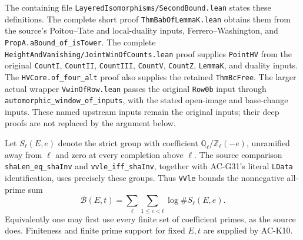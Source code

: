 The containing file \texttt{LayeredIsomorphisms/SecondBound.lean}
states these definitions.  The complete short proof
\texttt{ThmBabOfLemmaK.lean} obtains them from the source's
Poitou--Tate and local-duality inputs, Ferrero--Washington, and
\texttt{PropA.aBound\_of\_isTower}.  The complete
\texttt{HeightAndVanishing/JointWinOfCounts.lean} proof supplies
\texttt{PointHV} from the original \texttt{CountI},
\texttt{CountII}, \texttt{CountIII}, \texttt{CountV},
\texttt{CountZ}, \texttt{LemmaK}, and duality inputs.
The \texttt{HVCore.of\_four\_alt} proof also supplies the
retained \texttt{ThmBcFree}.  The larger actual wrapper
\texttt{VwinOfRow.lean} passes the original \texttt{Row0b}
input through \texttt{automorphic\_window\_of\_inputs}, with
the stated open-image and base-change inputs.
These named upstream inputs remain the original inputs; their
deep proofs are not replaced by the argument below.

Let $S_\ell(E,e)$ denote the strict group with coefficient
$\mathbb Q_\ell/\mathbb Z_\ell(-e)$, unramified away from
$\ell$ and zero at every completion above $\ell$.
The source comparison \texttt{shaLen\_eq\_shaInv} and
\texttt{vvle\_iff\_shaInv}, together with AC-G31's literal
\texttt{LData} identification, uses precisely these groups.
Thus \texttt{VVle} bounds the nonnegative all-prime sum
\[
 \mathcal B(E,t)=
  \sum_\ell\sum_{1\leq e<t}\log\#S_\ell(E,e).                    \tag{AW.3}
\]
Equivalently one may first use every finite set of coefficient
primes, as the source does.  Finiteness and finite prime support
for fixed $E,t$ are supplied by AC-K10.

